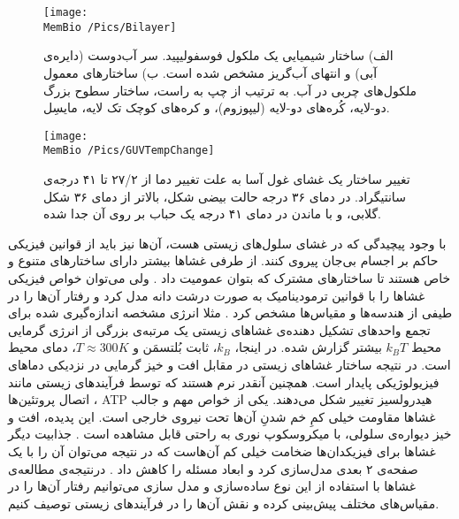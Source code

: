 \begin{figure}[h]
\begin{center}
\texttt{[image: \\MemBio /Pics/Bilayer]}
\caption{
الف) ساختار شیمیایی یک ملکول فوسفولیپید. سر آب‌دوست (دایره‌ی آبی) و  انتهای آب‌گریز مشخص شده است. ب) ساختار‌های معمول ملکول‌های چربی در آب. به ترتیب از چپ به راست، ساختار سطوح بزرگ دو-لایه، کُره‌های دو-لایه (لیپوزوم)، و کره‌های کوچک تک لایه، مایسِل.
}
\label{fig:bilayer}
\end{center}
\end{figure}




\begin{figure}[h]
\begin{center}
\texttt{[image: \\MemBio /Pics/GUVTempChange]}
\caption{
تغییر ساختار یک غشای غول ‌آسا به علت تغییر دما از ۲۷/۲ تا ۴۱ درجه‌ی سانتیگراد. در دمای ۳۶ درجه حالت بیضی شکل، بالاتر از دمای ۳۶ شکل گلابی، و با ماندن در دمای ۴۱ درجه یک حباب بر روی آن جدا شده.
}
\label{fig:GUVTempChange}
\end{center}
\end{figure}






با وجود پیچیدگی‌ که در غشای سلول‌های زیستی هست، آن‌ها نیز باید از قوانین فیزیکی حاکم بر اجسام بی‌جان پیروی کنند. از طرفی غشا‌ها بیشتر دارای ساختارهای متنوع و خاص هستند تا ساختارهای مشترک که بتوان عمومیت داد
\cite{NelsonBook2004}.
ولی می‌توان خواص فیزیکی غشاها را با قوانین ترمودینامیک به صورت درشت دانه مدل کرد و رفتار‌ آن‌ها را در طیفی از هندسه‌ها و مقیاس‌ها مشخص کرد
\cite{Seifert1997}.
 مثلا انرژی مشخصه اندازه‌گیری شده برای تجمع واحد‌های تشکیل‌ دهنده‌ی غشاهای زیستی یک مرتبه‌ی بزرگی از انرژی گرمایی محیط 
$k_BT$
بیشتر گزارش شده. در اینجا، 
$k_B$،
ثابت بُلتسمَن و 
$T\approx300K$،
دمای محیط است. در نتیجه ساختار غشاهای زیستی در مقابل افت و خیز گرمایی در نزدیکی دماهای فیزیولوژیکی پایدار است. همچنین آنقدر نرم  هستند که توسط فرآیندهای زیستی مانند اتصال پروتئین‌ها
\cite{NelsonBook2004,Seifert1997,Deserno2015}،
ATP
هیدرولسیز
\cite{Boyle2008Biology,Lipowskyb1995ook}
تغییر شکل می‌دهند.
یکی از خواص مهم و جالب غشاها مقاومت خیلی کمِ خم شدنِ آن‌ها تحت نیروی خارجی است. این پدیده، افت و خیز دیواره‌ی سلولی، با میکروسکوپ نوری به راحتی قابل مشاهده است
\cite{NelsonBook2004}.
جذابیت دیگر غشا‌ها برای فیزیکدان‌ها ضخامت خیلی کم آن‌هاست که در نتیجه می‌توان آن را با یک صفحه‌ی ۲ بعدی مدل‌سازی کرد و ابعاد مسئله‌ را کاهش داد
\cite{Seifert1997,Deserno2015}.
درنتیجه‌ی مطالعه‌ی غشاها با استفاده از این نوع ساده‌سازی و مدل سازی می‌توانیم  رفتار آن‌ها را در مقیاس‌های مختلف پیش‌بینی کرده و نقش‌ آن‌ها را در فرآیند‌های زیستی توصیف کنیم.


